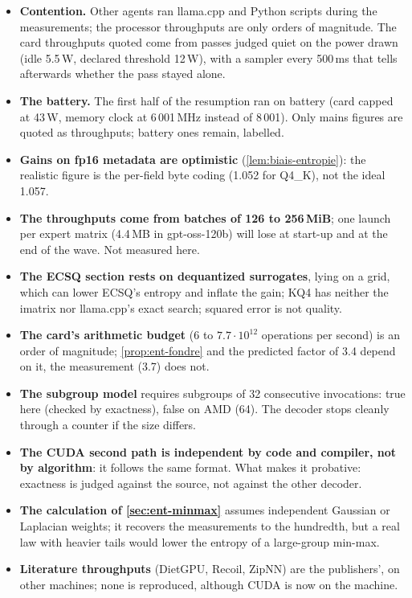 \begin{faux}
\begin{itemize}
\item \textbf{Contention.} Other agents ran llama.cpp and Python scripts during the measurements; the processor throughputs are only orders of magnitude. The card throughputs quoted come from passes judged quiet on the power drawn (idle 5.5\,W, declared threshold 12\,W), with a sampler every 500\,ms that tells afterwards whether the pass stayed alone.
\item \textbf{The battery.} The first half of the resumption ran on battery (card capped at 43\,W, memory clock at 6\,001\,MHz instead of 8\,001). Only mains figures are quoted as throughputs; battery ones remain, labelled.
\item \textbf{Gains on fp16 metadata are optimistic} (\cref{lem:biais-entropie}): the realistic figure is the per-field byte coding (1.052 for Q4\_K), not the ideal 1.057.
\item \textbf{The throughputs come from batches of 126 to 256\,MiB}; one launch per expert matrix (4.4\,MB in gpt-oss-120b) will lose at start-up and at the end of the wave. Not measured here.
\item \textbf{The ECSQ section rests on dequantized surrogates}, lying on a grid, which can lower ECSQ's entropy and inflate the gain; KQ4 has neither the imatrix nor llama.cpp's exact search; squared error is not quality.
\item \textbf{The card's arithmetic budget} (6 to $7.7\cdot10^{12}$ operations per second) is an order of magnitude; \cref{prop:ent-fondre} and the predicted factor of 3.4 depend on it, the measurement (3.7) does not.
\item \textbf{The subgroup model} requires subgroups of 32 consecutive invocations: true here (checked by exactness), false on AMD (64). The decoder stops cleanly through a counter if the size differs.
\item \textbf{The CUDA second path is independent by code and compiler, not by algorithm}: it follows the same format. What makes it probative: exactness is judged against the source, not against the other decoder.
\item \textbf{The calculation of \cref{sec:ent-minmax}} assumes independent Gaussian or Laplacian weights; it recovers the measurements to the hundredth, but a real law with heavier tails would lower the entropy of a large-group min-max.
\item \textbf{Literature throughputs} (DietGPU, Recoil, ZipNN) are the publishers', on other machines; none is reproduced, although CUDA is now on the machine.
\end{itemize}
\end{faux}

